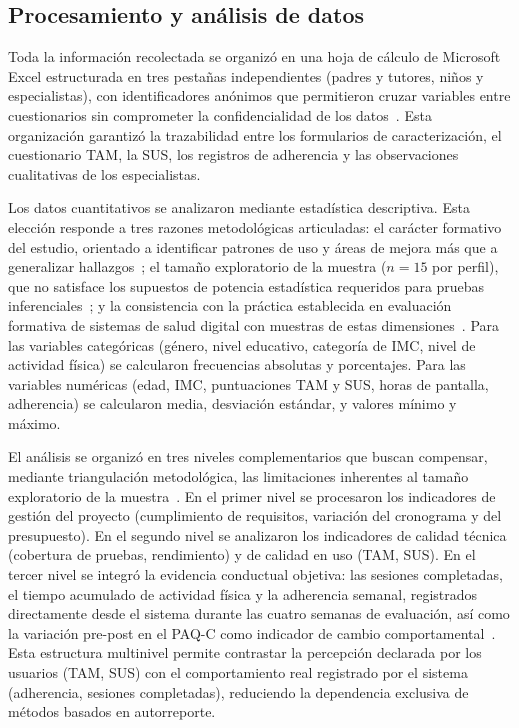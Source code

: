 			\subsection{Procesamiento y análisis de datos}
				Toda la información recolectada se organizó en una hoja de cálculo de Microsoft Excel estructurada en tres pestañas independientes (padres y tutores, niños y especialistas), con identificadores anónimos que permitieron cruzar variables entre cuestionarios sin comprometer la confidencialidad de los datos~\cite{LOPDP2021}. Esta organización garantizó la trazabilidad entre los formularios de caracterización, el cuestionario TAM, la SUS, los registros de adherencia y las observaciones cualitativas de los especialistas.
				
				Los datos cuantitativos se analizaron mediante estadística descriptiva. Esta elección responde a tres razones metodológicas articuladas: el carácter formativo del estudio, orientado a identificar patrones de uso y áreas de mejora más que a generalizar hallazgos~\cite{HernandezSampieri2014}; el tamaño exploratorio de la muestra ($n = 15$ por perfil), que no satisface los supuestos de potencia estadística requeridos para pruebas inferenciales~\cite{Creswell2018}; y la consistencia con la práctica establecida en evaluación formativa de sistemas de salud digital con muestras de estas dimensiones~\cite{Bangor2009,Direito2017}. Para las variables categóricas (género, nivel educativo, categoría de IMC, nivel de actividad física) se calcularon frecuencias absolutas y porcentajes. Para las variables numéricas (edad, IMC, puntuaciones TAM y SUS, horas de pantalla, adherencia) se calcularon media, desviación estándar, y valores mínimo y máximo.
				
				El análisis se organizó en tres niveles complementarios que buscan compensar, mediante triangulación metodológica, las limitaciones inherentes al tamaño exploratorio de la muestra~\cite{Creswell2018}. En el primer nivel se procesaron los indicadores de gestión del proyecto (cumplimiento de requisitos, variación del cronograma y del presupuesto). En el segundo nivel se analizaron los indicadores de calidad técnica (cobertura de pruebas, rendimiento) y de calidad en uso (TAM, SUS). En el tercer nivel se integró la evidencia conductual objetiva: las sesiones completadas, el tiempo acumulado de actividad física y la adherencia semanal, registrados directamente desde el sistema durante las cuatro semanas de evaluación, así como la variación pre-post en el PAQ-C como indicador de cambio comportamental~\cite{MateoOrcajada2024}. Esta estructura multinivel permite contrastar la percepción declarada por los usuarios (TAM, SUS) con el comportamiento real registrado por el sistema (adherencia, sesiones completadas), reduciendo la dependencia exclusiva de métodos basados en autorreporte.
				
